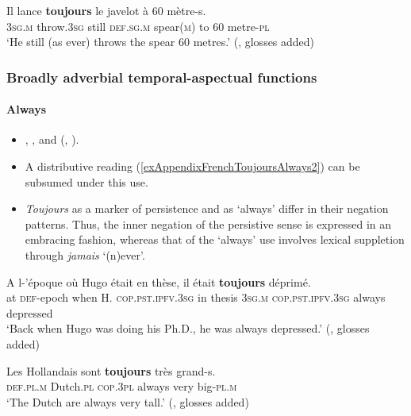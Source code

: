 \begin{exe}

	\ex 
	\gll Il lance \textbf{toujours} le javelot à 60 mètre-s.\\
	3\textsc{sg}.\textsc{m} throw.3\textsc{sg} still \textsc{def}.\textsc{sg}.\textsc{m} spear(\textsc{m}) to 60 metre-\textsc{pl}\\
	\glt \lq He still (as ever) throws the spear 60 metres.\rq{ }(\cite[230]{Muller1991}, glosses added)

\end{exe}
\pagebreak
\subsubsection{Broadly adverbial temporal-aspectual functions}
\paragraph{Always}\label{appendixFrenchToujoursAlways}
\begin{itemize}
	\item \textcite[s.v. \textit{toujours}]{Dicctionnaire}, \textcite{Fuchs1988}, \textcite[136–139]{MosegaardHansen2008} and \citeauthor{Muller1975} (\citeyear{Muller1975}, \citeyear{Muller1991}).
	\item A distributive reading (\ref{exAppendixFrenchToujoursAlways2}) can be subsumed under this use.
	\item \textit{Toujours} as a marker of persistence and as \lq always\rq{ }differ in their negation patterns. Thus, the inner negation of the persistive sense is expressed in an embracing fashion, whereas that of the \lq always\rq{ }use involves lexical suppletion through \textit{jamais} \lq (n)ever\rq{}. 
\end{itemize}


\begin{exe}
	\ex 
	\gll A l-’époque où Hugo était en thèse, il était \textbf{toujours} déprimé.\\
	at \textsc{def}-epoch when H. \textsc{cop}.\textsc{pst}.\textsc{ipfv}.3\textsc{sg} in thesis 3\textsc{sg}.\textsc{m} \textsc{cop}.\textsc{pst}.\textsc{ipfv}.3\textsc{sg} always depressed\\
	\glt \lq Back when Hugo was doing his Ph.D., he was always depressed.\rq{ }(\cite[138]{MosegaardHansen2008}, glosses added)

	\ex\label{exAppendixFrenchToujoursAlways2}
	\gll Les Hollandais sont \textbf{toujours} très grand-s.\\
	\textsc{def}.\textsc{pl}.\textsc{m} Dutch.\textsc{pl} \textsc{cop}.3\textsc{pl} always very big-\textsc{pl}.\textsc{m}\\
	\glt \lq The Dutch are always very tall.\rq{ }(\cite[138]{MosegaardHansen2008}, glosses added)
\end{exe}

